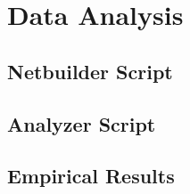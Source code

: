 \section{Data Analysis}
\subsection{Netbuilder Script}
\subsection{Analyzer Script}
\subsection{Empirical Results}
